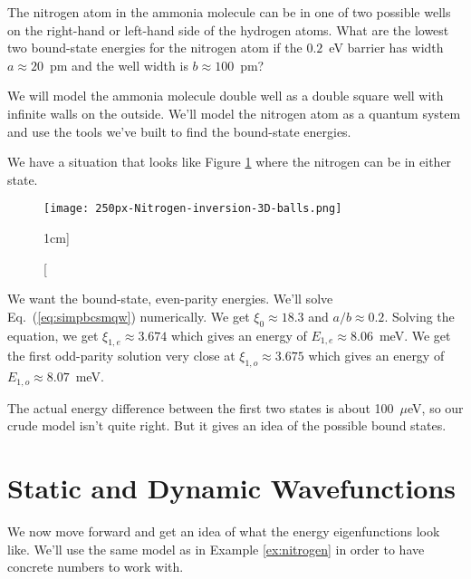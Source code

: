 \begin{example}
\label{ex:nitrogen}
The nitrogen atom in the ammonia molecule can be in one of two possible wells on the right-hand or left-hand side of the hydrogen atoms. What are the lowest two bound-state energies for the nitrogen atom if the $0.2$~eV barrier has width  $a\approx20$~pm and the well width is $b\approx100$~pm?

\model We will model the ammonia molecule double well as a double square well with infinite walls on the outside. We'll model the nitrogen atom as a quantum system and use the tools we've built to find the bound-state energies.

\vis We have a situation that looks like Figure \ref{fig:nh3fig} where the nitrogen can be in either state.
\begin{figure}
\centering
\texttt{[image: 250px-Nitrogen-inversion-3D-balls.png]}
\caption[][1cm]{ }
\label{fig:nh3fig}
\end{figure}

\sol We want the bound-state, even-parity energies. We'll solve Eq.~(\ref{eq:simpbcsmqw}) numerically. We get $\xi_0 \approx 18.3$ and $a/b \approx 0.2$. Solving the equation, we get $\xi_{1,e} \approx 3.674$ which gives an energy of $E_{1,e} \approx 8.06$~meV. We get the first odd-parity solution very close at $\xi_{1,o} \approx 3.675$ which gives an energy of $E_{1,o} \approx 8.07$~meV.

\assess The actual energy difference between the first two states is about 100~$\mu$eV, so our crude model isn't quite right. But it gives an idea of the possible bound states.

\end{example}

\section{Static and Dynamic Wavefunctions}

We now move forward and get an idea of what the energy eigenfunctions look like. We'll use the same model as in Example \ref{ex:nitrogen} in order to have concrete numbers to work with.

